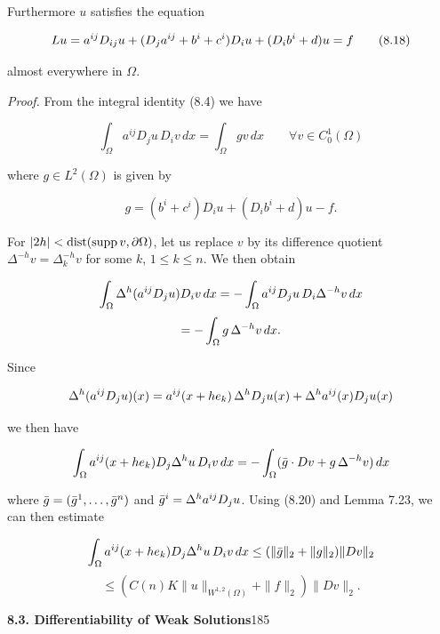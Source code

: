 
Furthermore $u$ satisfies the equation

\begin{equation}
Lu = a^{ij}D_{ij} u + (D_j a^{ij} + b^i + c^i)D_i u + (D_i b^i + d)u = f
\tag{8.18}
\end{equation}

almost everywhere in $\Omega$.

\medskip

\noindent\textit{Proof.} From the integral identity (8.4) we have

\begin{equation}
\int_{\Omega} a^{ij} D_j u\, D_i v\, dx = \int_{\Omega} g v\, dx \qquad \forall v \in C_0^1(\Omega)
\tag{8.19}
\end{equation}

where $g \in L^2(\Omega)$ is given by

\begin{equation}
 g = (b^i + c^i)D_i u + (D_i b^i + d)u - f.
\tag{8.20}
\end{equation}

For $|2h| < \operatorname{dist}(\operatorname{supp} v, \partial\Omega)$, let us replace $v$ by its difference quotient $\Delta^{-h}v = \Delta_k^{-h}v$
for some $k$, $1 \le k \le n$. We then obtain

\[
\int_{\Omega} \Delta^{h}(a^{ij}D_j u)D_i v\, dx = -\int_{\Omega} a^{ij} D_j u\, D_i\Delta^{-h}v\, dx
\]
\[
= -\int_{\Omega} g\, \Delta^{-h}v\, dx.
\]

Since

\[
\Delta^{h}(a^{ij}D_j u)(x) = a^{ij}(x+he_k)\, \Delta^{h}D_j u(x) + \Delta^{h}a^{ij}(x)D_j u(x)
\]

we then have

\[
\int_{\Omega} a^{ij}(x+he_k)D_j\Delta^{h}u\,D_i v\,dx = -\int_{\Omega}(\bar g\cdot Dv + g\,\Delta^{-h}v)\,dx
\]

where $\bar g = (\bar g^1,\ldots,\bar g^n)$ and $\bar g^i = \Delta^{h}a^{ij}D_j u$. Using (8.20) and Lemma 7.23, we can then estimate

\[
\int_{\Omega} a^{ij}(x+he_k)D_j\Delta^{h}u\,D_i v\,dx \le (\|\bar g\|_2 + \|g\|_2)\|Dv\|_2
\]
\[
\le (C(n)K\|u\|_{W^{1,2}(\Omega)} + \|f\|_2)\|Dv\|_2.
\]



\setcounter{page}{185}
\noindent\textbf{8.3. Differentiability of Weak Solutions}\hfill 185

\bigskip

